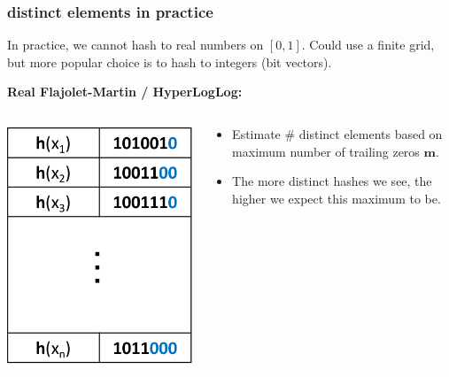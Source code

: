 \documentclass[compress]{beamer}
\newcommand{\bv}[1]{\mathbf{#1}}
\begin{document}
\begin{frame}
	\frametitle{distinct elements in practice}
	In practice, we cannot hash to real numbers on $[0,1]$. Could use a finite grid, but more popular choice is to hash to integers (bit vectors).
	
	\textbf{Real Flajolet-Martin / HyperLogLog:}
	\begin{columns}
		\begin{column}{.4\textwidth}
			\begin{center}
				\includegraphics[width=.7\textwidth]{loglog2.png}
			\end{center}
		\end{column}
		\begin{column}{.6\textwidth}
				\begin{itemize}
					\item Estimate \# distinct elements based on maximum number of trailing zeros $\bv m$.
					\item The more distinct hashes we see, the higher we expect this maximum to be.
				\end{itemize}
		\end{column}
	\end{columns}
	\begin{center}
	\end{center}
\end{frame}
\end{document}
